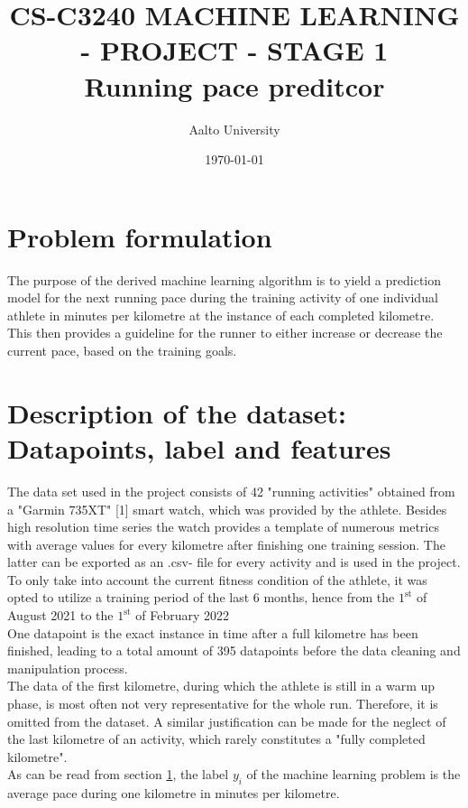 \documentclass[11pt]{article}
\title{\Huge CS-C3240 MACHINE LEARNING - PROJECT - STAGE 1  \\Running pace preditcor}
\author{Aalto University}
\date{\today}
\begin{document}
\maketitle

\section{Problem formulation}
\label{section: 1}
The purpose of the derived machine learning algorithm is to yield a prediction model for the next running pace during the training activity of one individual athlete in minutes per kilometre at the instance of each completed kilometre. This then provides a guideline for the runner to either increase or decrease the current pace, based on the training goals.

\section{Description of the dataset: Datapoints, label and features}
The data set used in the project consists of 42 "running activities" obtained from a "Garmin 735XT" [1] smart watch, which was provided by the athlete.  Besides high resolution time series the watch provides a template of numerous metrics with average values for every kilometre after finishing one training session. The latter can be exported as an .csv- file for every activity and is used in the project.
To only take into account the current fitness condition of the athlete, it was opted to utilize a training period of the last 6 months, hence from the $1^{\text{st}}$ of August 2021 to the $1^{\text{st}}$ of February 2022\\
One datapoint is the exact instance in time after a full kilometre has been finished, leading to a total amount of 395 datapoints before the data cleaning and manipulation process.\\
The data of the first kilometre, during which the athlete is still in a warm up phase, is most often not very representative for the whole run. Therefore, it is omitted from the dataset. A similar justification can be made for the neglect of the last kilometre of an activity, which rarely constitutes a "fully completed kilometre".\\
As can be read from section \ref{section: 1}, the label ${y_i}$ of the machine learning problem is the average pace during one kilometre in minutes per kilometre.\\
\end{document}
